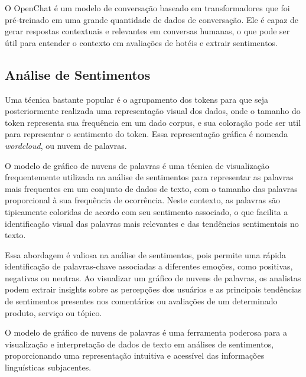 O OpenChat \cite{wang2023openchat}  é um modelo de conversação baseado em transformadores que foi pré-treinado em uma grande quantidade de dados de conversação. Ele é capaz de gerar respostas contextuais e relevantes em conversas humanas, o que pode ser útil para entender o contexto em avaliações de hotéis e extrair sentimentos.


\subsection{Análise de Sentimentos}



%
Uma técnica bastante popular é o agrupamento dos tokens para que seja posteriormente realizada uma representação visual dos dados, onde o tamanho do token representa sua frequência em um dado corpus, e sua coloração pode ser util para representar o sentimento do token. Essa representação gráfica é nomeada \emph{wordcloud}, ou nuvem de palavras.

O modelo de gráfico de nuvens de palavras é uma técnica de visualização frequentemente utilizada na análise de sentimentos para representar as palavras mais frequentes em um conjunto de dados de texto, com o tamanho das palavras proporcional à sua frequência de ocorrência. Neste contexto, as palavras são tipicamente coloridas de acordo com seu sentimento associado, o que facilita a identificação visual das palavras mais relevantes e das tendências sentimentais no texto.

Essa abordagem é valiosa na análise de sentimentos, pois permite uma rápida identificação de palavras-chave associadas a diferentes emoções, como positivas, negativas ou neutras. Ao visualizar um gráfico de nuvens de palavras, os analistas podem extrair insights sobre as percepções dos usuários e as principais tendências de sentimentos presentes nos comentários ou avaliações de um determinado produto, serviço ou tópico.

O modelo de gráfico de nuvens de palavras é uma ferramenta poderosa para a visualização e interpretação de dados de texto em análises de sentimentos, proporcionando uma representação intuitiva e acessível das informações linguísticas subjacentes.

